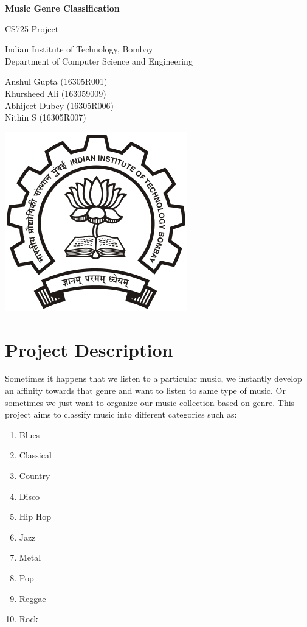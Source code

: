 \documentclass[a4paper,10pt]{article}
\begin{document}
\begin{titlepage}
\begin{center}
\vspace*{1cm}

\huge{\textbf{Music Genre Classification}}

\vspace{0.5cm}
CS725 Project

\vspace{3.5cm}
Indian Institute of Technology, Bombay\\
Department of Computer Science and Engineering
\vspace{3.5cm}

\Large{Anshul Gupta (16305R001) \\ Khursheed Ali (163059009) \\ Abhijeet Dubey (16305R006) \\ Nithin S (16305R007)}

\vfill

\vspace{0.8cm}

\includegraphics[scale=0.35]{IITB.png}
\end{center}
\end{titlepage}
 
\tableofcontents


\newpage
\section{Project Description}
Sometimes it happens that we listen to a particular music, we instantly develop an affinity towards that genre and want to listen to same type of music. Or sometimes we just want to organize our music collection based on genre.
This project aims to classify music into different categories such as:
\begin{enumerate}
 \item Blues
 \item Classical
 \item Country
 \item Disco
 \item Hip Hop
 \item Jazz
 \item Metal
 \item Pop
 \item Reggae
 \item Rock
\end{enumerate}
\end{document}
